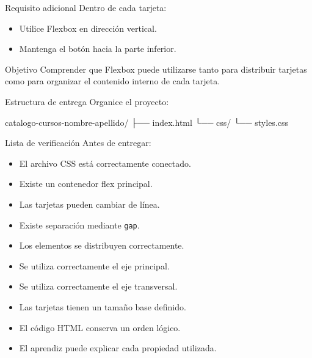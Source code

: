 \documentclass[aspectratio=169,11.5pt]{beamer}
\begin{document}
    \begin{frame}{Requisito adicional}
        Dentro de cada tarjeta:

        \begin{itemize}
            \item Utilice Flexbox en dirección vertical.
            \item Mantenga el botón hacia la parte inferior.
        \end{itemize}

        \begin{block}{Objetivo}
            Comprender que Flexbox puede utilizarse
            tanto para distribuir tarjetas como para organizar
            el contenido interno de cada tarjeta.
        \end{block}
    \end{frame}

    \begin{frame}[fragile]{Estructura de entrega}
        Organice el proyecto:

        \begin{bashcodedark}
            catalogo-cursos-nombre-apellido/
            ├── index.html
            └── css/
            └── styles.css
        \end{bashcodedark}
    \end{frame}

    \begin{frame}{Lista de verificación}
        Antes de entregar:

        \begin{itemize}
            \item El archivo CSS está correctamente conectado.
            \item Existe un contenedor flex principal.
            \item Las tarjetas pueden cambiar de línea.
            \item Existe separación mediante \texttt{gap}.
            \item Los elementos se distribuyen correctamente.
            \item Se utiliza correctamente el eje principal.
            \item Se utiliza correctamente el eje transversal.
            \item Las tarjetas tienen un tamaño base definido.
            \item El código HTML conserva un orden lógico.
            \item El aprendiz puede explicar cada propiedad utilizada.
        \end{itemize}
    \end{frame}
\end{document}
